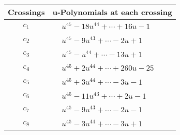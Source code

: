 \documentclass[1p]{elsarticle_modified}
\theoremstyle{definition}
\begin{document}
\begin{tabular}{m{50pt}|m{274pt}}
Crossings & \hspace{64pt}u-Polynomials at each crossing \\
\hline $$\begin{aligned}c_{1}\end{aligned}$$&$\begin{aligned}
&u^{45}-18 u^{44}+\cdots+16 u-1
\end{aligned}$\\
\hline $$\begin{aligned}c_{2}\end{aligned}$$&$\begin{aligned}
&u^{45}-9 u^{43}+\cdots-2 u+1
\end{aligned}$\\
\hline $$\begin{aligned}c_{3}\end{aligned}$$&$\begin{aligned}
&u^{45}- u^{44}+\cdots+13 u+1
\end{aligned}$\\
\hline $$\begin{aligned}c_{4}\end{aligned}$$&$\begin{aligned}
&u^{45}+2 u^{44}+\cdots+260 u-25
\end{aligned}$\\
\hline $$\begin{aligned}c_{5}\end{aligned}$$&$\begin{aligned}
&u^{45}+3 u^{44}+\cdots-3 u-1
\end{aligned}$\\
\hline $$\begin{aligned}c_{6}\end{aligned}$$&$\begin{aligned}
&u^{45}-11 u^{43}+\cdots+2 u-1
\end{aligned}$\\
\hline $$\begin{aligned}c_{7}\end{aligned}$$&$\begin{aligned}
&u^{45}-9 u^{43}+\cdots-2 u-1
\end{aligned}$\\
\hline $$\begin{aligned}c_{8}\end{aligned}$$&$\begin{aligned}
&u^{45}-3 u^{44}+\cdots-3 u+1
\end{aligned}$\\

\end{tabular}
\end{document}
